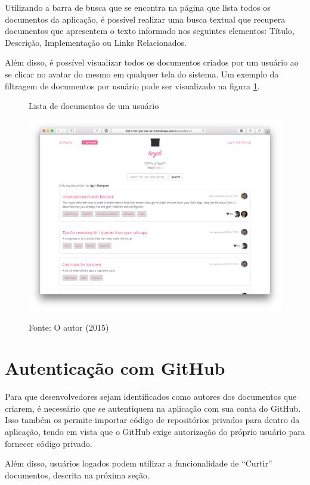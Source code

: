 Utilizando a barra de busca que se encontra na página que lista todos os documentos da aplicação, é possível realizar uma busca textual que recupera documentos que apresentem o texto informado nos seguintes elementos: Título, Descrição, Implementação ou Links Relacionados.

Além disso, é possível visualizar todos os documentos criados por um usuário ao se clicar no avatar do mesmo em qualquer tela do sistema. Um exemplo da filtragem de documentos por usuário pode ser visualizado na figura \ref{fig:doc-by-user}.

\clearpage

\begin{figure}[ht]
	\centering
    \caption{Lista de documentos de um usuário}
    \includegraphics[width=15cm]{Imagens/print-by-user.png}
		\label{fig:doc-by-user}
	\caption*{Fonte: O autor (2015)}
\end{figure}

\section{Autenticação com GitHub}

Para que desenvolvedores sejam identificados como autores dos documentos que criarem, é necessário que se autentiquem na aplicação com sua conta do GitHub. Isso também os permite importar código de repositórios privados para dentro da aplicação, tendo em vista que o GitHub exige autorização do próprio usuário para fornecer código privado.

Além disso, usuários logados podem utilizar a funcionalidade de ``Curtir'' documentos, descrita na próxima seção.

